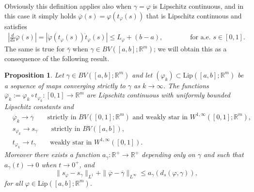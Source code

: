 \documentclass[a4paper,11pt]{article}
\numberwithin{equation}{section}
\newtheorem{prop}[theorem]{Proposition}
\newcommand{\R}{\mathbb{R}}
\begin{document}
Obviously this definition applies also when $\gamma=\varphi$ is Lipschitz continuous, and in this case 
it simply holds $\overline \varphi(s)=\varphi(t_\varphi(s))$ that is Lipschitz continuous and satisfies
\begin{align}
\left|\frac{d}{ds}\overline \varphi(s)\right|=\left|\dot \varphi(t_\varphi(s))\dot t_\varphi(s)\right|\leq L_\varphi+(b-a),\qquad \qquad \text{for a.e. }s\in [0,1].
\end{align}
The same is true for $\overline \gamma$ when $\gamma\in  BV([a,b];\R^m)$; we will obtain this as a consequence of the following result.

\begin{prop}\label{prop_convstrict}
Let $\gamma\in BV([a,b];\R^m)$ and let $(\varphi_k)\subset \textrm{Lip}([a,b];\R^m)$ be a sequence of maps converging strictly to $\gamma$ as $k\rightarrow \infty$. The functions $\overline \varphi_k:=\varphi_k\circ t_{\varphi_k}:[0,1]\rightarrow \R^m$ are Lipschitz continuous with uniformly bounded Lipschitz constants and \begin{align}\label{conv_curves}
&\overline\varphi_k\rightarrow \overline \gamma\qquad \text{strictly in $BV([0,1];\R^m)$ and weakly star in }W^{1,\infty}([0,1];\R^m),\nonumber\\
&s_{\varphi_k}\rightarrow s_\gamma\qquad \text{strictly in }BV([a,b]),\\
&t_{\varphi_k}\rightarrow t_\gamma\qquad \text{weakly star in }W^{1,\infty}([0,1]).\nonumber
\end{align}  
Moreover there exists a function $a_\gamma:\R^+\rightarrow \R^+$ depending only on $\gamma$ and such that $a_\gamma(t)\rightarrow 0$ when $t\rightarrow0^+$, and 
$$\|s_{\varphi}-s_\gamma\|_{L^1}+\|\overline\varphi-\overline \gamma\|_{L^\infty}\leq a_\gamma(d_s(\varphi,\gamma)),$$
for all $\varphi\in \textrm{Lip}([a,b];\R^m)$. 
\end{prop}
\end{document}

